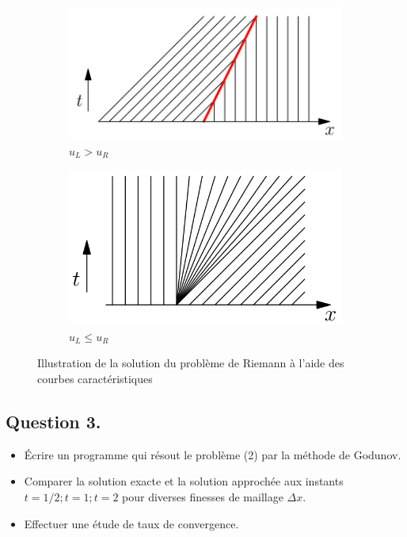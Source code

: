 \documentclass[
	french,
	11pt, %
]{fphw}
\begin{document}
\begin{figure}[h]
	\centering
	\begin{subfigure}[b]{0.4\textwidth}
		\centering
		\includegraphics[width=\textwidth]{Riemann1.PNG}
		\caption{$u_L > u_R$}
	\end{subfigure}
	\begin{subfigure}[b]{0.4\textwidth}
		\centering
		\includegraphics[width=\textwidth]{Riemann2.PNG}
		\caption{$u_L \leq u_R$}
	\end{subfigure}
	\captionsetup{justification=centering}
	\caption{Illustration de la solution du problème de Riemann à l'aide des courbes caractéristiques}
	\label{fig:IllusRiem}
\end{figure}



\subsection*{Question 3.}
\begin{problem}
	\begin{itemize}
	\item Écrire un programme qui résout le problème (2) par la méthode de Godunov. 
	
	\item Comparer la solution exacte et la solution approchée aux instants $t = 1/2; t = 1; t = 2$ pour diverses finesses de maillage $\Delta x$. 
	
	\item Effectuer une étude de taux de convergence.
	\end{itemize}
\end{problem}
\end{document}
